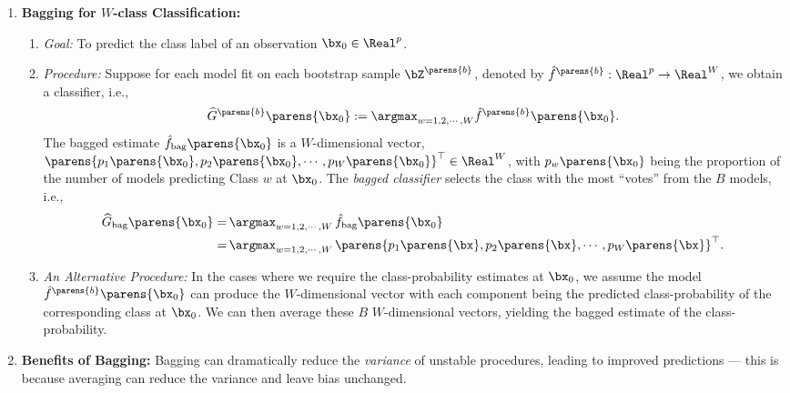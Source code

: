 \documentclass[12pt]{article}
\begin{document}
\begin{enumerate}[label=\textbf{\arabic*.}]
	\item \textbf{Bagging for $W$-class Classification:} 
	\begin{enumerate}
		\item \textit{Goal:} To predict the class label of an observation $\bx_0 \in \Real^p$. 
		\item \textit{Procedure:} Suppose for each model fit on each bootstrap sample $\bZ^{\parens{b}}$, denoted by $\hat{f}^{\parens{b}}: \Real^p \to \Real^W$, we obtain a classifier, i.e., 
		\begin{align*}
			\widehat{G}^{\parens{b}} \parens{\bx_0} := \argmax_{w=1, 2, \cdots, W} \hat{f}^{\parens{b}} \parens{\bx_0}. %
		\end{align*}
		The bagged estimate $\hat{f}_{\mathrm{bag}} \parens{\bx_0}$ is a $W$-dimensional vector, $\parens{p_1 \parens{\bx_0}, p_2 \parens{\bx_0}, \cdots, p_W \parens{\bx_0}}^\top \in \Real^W$, with $p_w \parens{\bx_0}$ being the proportion of the number of models predicting Class $w$ at $\bx_0$. The \textit{bagged classifier} selects the class with the most ``votes'' from the $B$ models, i.e., 
		\begin{align*}
			\widehat{G}_{\mathrm{bag}} \parens{\bx_0} = & \, \argmax_{w=1,2,\cdots,W} \, \hat{f}_{\mathrm{bag}} \parens{\bx_0} \\ 
			= & \, \argmax_{w=1,2,\cdots,W} \, \parens{p_1 \parens{\bx}, p_2 \parens{\bx}, \cdots, p_W \parens{\bx}}^\top. 
		\end{align*}
		
		\item \textit{An Alternative Procedure:} In the cases where we require the class-probability estimates at $\bx_0$, we assume the model $\hat{f}^{\parens{b}} \parens{\bx_0}$ can produce the $W$-dimensional vector with each component being the predicted class-probability of the corresponding class at $\bx_0$. We can then average these $B$ $W$-dimensional vectors, yielding the bagged estimate of the class-probability. 
		
	\end{enumerate}
	
	\item \textbf{Benefits of Bagging:} Bagging can dramatically reduce the \emph{variance} of unstable procedures, leading to improved predictions --- this is because averaging can reduce the variance and leave bias unchanged. 
	

\end{enumerate}
\end{document}
